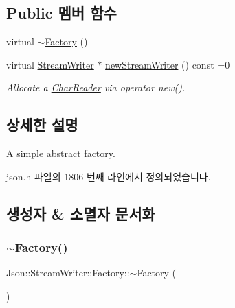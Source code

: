 \subsection*{Public 멤버 함수}
\begin{DoxyCompactItemize}
\item 
virtual \hyperlink{class_json_1_1_stream_writer_1_1_factory_ad334ad5e81e3b9b1768620a446366ff1}{$\sim$\+Factory} ()
\item 
virtual \hyperlink{class_json_1_1_stream_writer}{Stream\+Writer} $\ast$ \hyperlink{class_json_1_1_stream_writer_1_1_factory_a9d30ec53e8288cd53befccf1009c5f31}{new\+Stream\+Writer} () const =0
\begin{DoxyCompactList}\small\item\em Allocate a \hyperlink{class_json_1_1_char_reader}{Char\+Reader} via operator new(). \end{DoxyCompactList}\end{DoxyCompactItemize}


\subsection{상세한 설명}
A simple abstract factory. 

json.\+h 파일의 1806 번째 라인에서 정의되었습니다.



\subsection{생성자 \& 소멸자 문서화}
\mbox{\label{class_json_1_1_stream_writer_1_1_factory_ad334ad5e81e3b9b1768620a446366ff1}} 
\subsubsection{\texorpdfstring{$\sim$\+Factory()}{~Factory()}}
{\footnotesize\ttfamily Json\+::\+Stream\+Writer\+::\+Factory\+::$\sim$\+Factory (\begin{DoxyParamCaption}{ }\end{DoxyParamCaption})\hspace{0.3cm}{\ttfamily [virtual]}}



